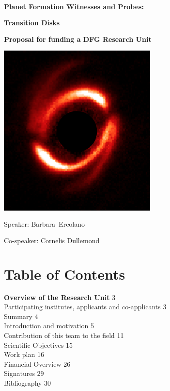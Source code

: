 \documentclass[10pt,fleqn,twoside,a4paper]{article}
\newcommand{\Titlecol}{\color{Black}}
\begin{document}
\pagestyle{empty}
\mbox{}
\vspace{1cm}\\

\centerline{\Titlecol\huge \bf Planet Formation Witnesses and Probes:}
\vspace{0.5cm}
\centerline{\Titlecol\huge \bf Transition Disks}
\vspace{2cm}
\centerline{\Titlecol\Large \bf Proposal for funding a DFG Research Unit}
\vspace{2cm}
\centerline{\includegraphics[width=0.6\textwidth]{figures/HD100453.png}}
\vspace{1cm}
\centerline{\Large Speaker: Barbara~Ercolano}
\vspace{0.5cm}
\centerline{\Large Co-speaker: Cornelis Dullemond}


\pagebreak[4]

\mbox{}
\section*{Table of Contents}
 {\bf Overview of the Research Unit} \hfill 3\\
 Participating institutes,  applicants and co-applicants \hfill 3\\
Summary \hfill 4 \\
Introduction and motivation \hfill 5 \\
Contribution of this team to the field \hfill 11 \\
Scientific Objectives \hfill 15 \\
Work plan \hfill 16 \\
Financial Overview \hfill 26 \\
Signatures \hfill 29 \\
Bibliography \hfill 30 \\
\end{document}
